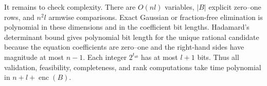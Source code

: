 It remains to check complexity. There are \(O(nl)\) variables, \(|B|\) explicit zero--one rows, and \(n^2l\) armwise comparisons. Exact Gaussian or fraction-free elimination is polynomial in these dimensions and in the coefficient bit lengths. Hadamard's determinant bound gives polynomial bit length for the unique rational candidate because the equation coefficients are zero--one and the right-hand sides have magnitude at most \(n-1\). Each integer \(2^{t_{ab}}\) has at most \(l+1\) bits. Thus all validation, feasibility, completeness, and rank computations take time polynomial in \(n+l+\operatorname{enc}(B)\).